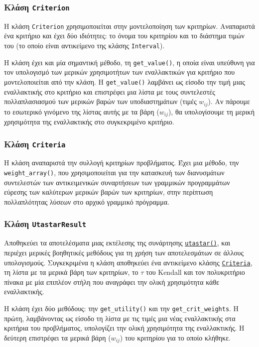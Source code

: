 \documentclass[11pt,a4paper,titlepage]{article}
\numberwithin{equation}{section}
\begin{document}
\subsubsection{Κλάση \texttt{Criterion}}
\label{sssec:Criterion}
Η κλάση \texttt{Criterion} χρησιμοποιείται στην μοντελοποίηση των κριτηρίων. Αναπαριστά ένα κριτήριο και έχει δύο ιδιότητες: το όνομα του κριτηρίου και το διάστημα τιμών του (το οποίο είναι αντικείμενο της κλάσης \texttt{Interval}).

Η κλάση έχει και μία σημαντική μέθοδο, τη \hypertarget{method:getvalue}{\texttt{get\_value()}}, η οποία είναι υπεύθυνη για τον υπολογισμό των μερικών χρησιμοτήτων των εναλλακτικών για κριτήριο που μοντελοποιείται από την κλάση. Η \texttt{get\_value()} λαμβάνει ως είσοδο την τιμή μιας εναλλακτικής στο κριτήριο και επιστρέφει μια λίστα με τους συντελεστές πολλαπλασιασμού των μερικών βαρών των υποδιαστημάτων (τιμές $ w_{ij} $). Αν πάρουμε το εσωτερικό γινόμενο της λίστας αυτής με τα βάρη ($ w_{ij} $), θα υπολογίσουμε τη μερική χρησιμότητα της εναλλακτικής στο συγκεκριμένο κριτήριο.

\subsubsection{Κλάση \texttt{Criteria}}
\label{sssec:Criteria}
Η κλάση αναπαριστά την συλλογή κριτηρίων προβλήματος. Έχει μια μέθοδο, την \texttt{weight\_array()}, που χρησιμοποιείται για την κατασκευή των διανυσμάτων συντελεστών των αντικειμενικών συναρτήσεων των γραμμικών προγραμμάτων εύρεσης των καλύτερων μερικών βαρών των κριτηρίων, στην περίπτωση πολλαπλότητας λύσεων στο αρχικό γραμμικό πρόγραμμα.

\subsubsection{Κλάση \texttt{UtastarResult}}
\label{sssec:UtastarResult}
Αποθηκεύει τα αποτελέσματα μιας εκτέλεσης της συνάρτησης \hyperref[sssec:utastar()]{\texttt{utastar()}}, και περιέχει μερικές βοηθητικές μεθόδους για τη χρήση των αποτελεσμάτων σε άλλους υπολογισμούς. 
Συγκεκριμένα η κλάση αποθηκεύει ένα αντικείμενο κλάσης \hyperref[sssec:UtastarResult]{\texttt{Criteria}}, τη λίστα με τα μερικά βάρη των κριτηρίων, το $ \tau $ του Kendall και τον πολυκριτήριο πίνακα με μία επιπλέον στήλη που αναγράφει την ολική χρησιμότητα κάθε εναλλακτικής.

Η κλάση έχει δύο μεθόδους: την \texttt{get\_utility()} και την \texttt{get\_crit\_weights}. H πρώτη, λαμβάνοντας ως είσοδο τη λίστα με τις τιμές μια νέας εναλλακτικής στα κριτήρια του προβλήματος, υπολογίζει την ολική χρησιμότητα της εναλλακτικής. Η δεύτερη επιστρέφει τα μερικά βάρη ($ w_{ij} $) του κριτηρίου για το οποίο κλήθηκε.
\end{document}
